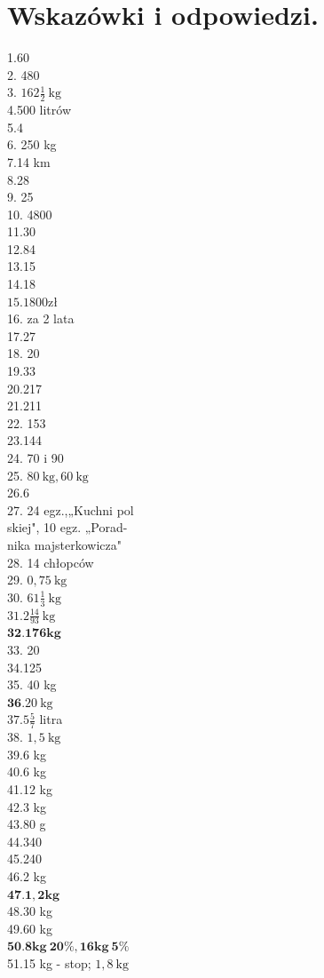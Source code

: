 \documentclass[10pt]{article}
\begin{document}
\section*{Wskazówki i odpowiedzi.}
1.60\\
2. 480\\
3. \(162 \frac{1}{2} \mathrm{~kg}\)\\
4.500 litrów\\
5.4\\
6. 250 kg\\
7.14 km\\
8.28\\
9. 25\\
10. 4800\\
11.30\\
12.84\\
13.15\\
14.18\\
\(15.1800 \mathrm{zł}\)\\
16. za 2 lata\\
17.27\\
18. 20\\
19.33\\
20.217\\
21.211\\
22. 153\\
23.144\\
24. 70 i 90\\
25. \(80 \mathrm{~kg}, 60 \mathrm{~kg}\)\\
26.6\\
27. 24 egz.,„Kuchni pol\\
skiej", 10 egz. „Porad-\\
nika majsterkowicza"\\
28. 14 chłopców\\
29. \(0,75 \mathrm{~kg}\)\\
30. \(61 \frac{1}{3} \mathrm{~kg}\)\\
\(31.2 \frac{14}{93} \mathrm{~kg}\)\\
\(\mathbf{3 2 . 1 7 6 k g}\)\\
33. 20\\
34.125\\
35. 40 kg\\
\(\mathbf{3 6 .} 20 \mathrm{~kg}\)\\
\(37.5 \frac{5}{7}\) litra\\
38. \(1,5 \mathrm{~kg}\)\\
39.6 kg\\
40.6 kg\\
41.12 kg\\
42.3 kg\\
43.80 g\\
44.340\\
45.240\\
46.2 kg\\
\(\mathbf{4 7 . 1 , 2 k g}\)\\
48.30 kg\\
49.60 kg\\
\(\mathbf{5 0 . 8 k g ~ 2 0 \% , 1 6 k g ~ 5 \% ~}\)\\
51.15 kg - stop; \(1,8 \mathrm{~kg}\)
\end{document}
